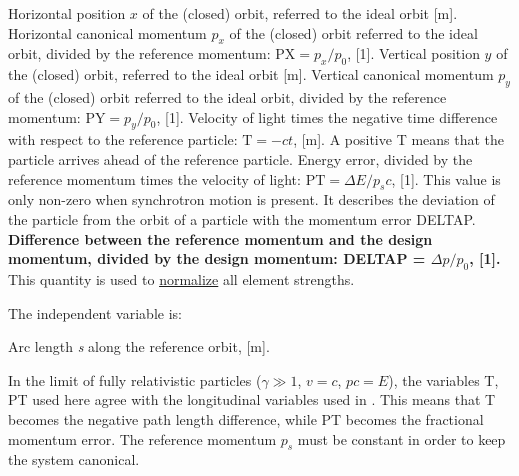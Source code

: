 \begin{madlist}
	 Horizontal position $x$ of the (closed) orbit,
	referred to the ideal orbit [m].    
	 Horizontal canonical momentum $p_x$ of the
	(closed) orbit referred to the ideal orbit, divided by the
	reference momentum: $\textrm{PX} = p_x / p_0$, [1].   
	 Vertical position $y$ of the (closed) orbit, referred
	to the ideal orbit [m].   
	 Vertical canonical momentum $p_y$ of the (closed)
	orbit referred to the ideal orbit, divided by the reference
	momentum: $\textrm{PY} = p_y / p_0$, [1].   
	 Velocity of light times the negative time difference with
	respect to the reference particle: $\textrm{T} =  - c t$, [m]. A
	positive T means that the particle arrives ahead of the reference
	particle.   
	 Energy error, divided by the reference momentum times the
	velocity of light: $\textrm{PT} = \Delta E / p_s c$, [1]. 
	This value is only non-zero when synchrotron motion is
	present. It describes the deviation of the particle from the orbit
	of a particle with the momentum error DELTAP.   
	 {\bf Difference between the reference momentum and the design
	momentum, divided by the design momentum: DELTAP =
	$\Delta p / p_0$, [1].} This quantity is used to
	\hyperref[chap:differences]{normalize} all element strengths.   
\end{madlist} 

The independent variable is: 
\begin{madlist}
    Arc length {\it s} along the reference orbit, 
  [m].   
\end{madlist} 

In the limit of fully relativistic particles ($\gamma \gg 1$, $v = c$,
$p c = E$), the variables T, PT used here agree with the
longitudinal variables used in \cite{TRANSPORT}. This means that T
becomes the negative path length difference, while PT becomes the
fractional momentum error. The reference momentum $p_s$ must be
constant in order to keep the system canonical.  

